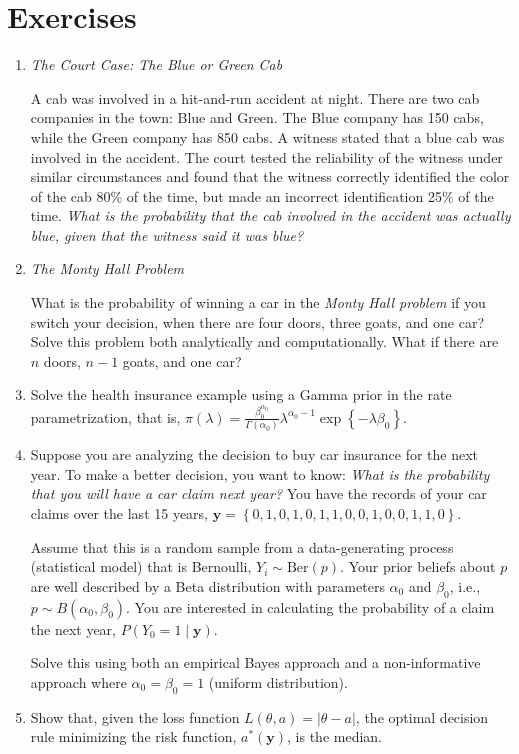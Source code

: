 \section{Exercises}

\begin{enumerate}
	\item \textit{The Court Case: The Blue or Green Cab}
	
	A cab was involved in a hit-and-run accident at night. There are two cab companies in the town: Blue and Green. The Blue company has 150 cabs, while the Green company has 850 cabs. A witness stated that a blue cab was involved in the accident. The court tested the reliability of the witness under similar circumstances and found that the witness correctly identified the color of the cab 80\% of the time, but made an incorrect identification 25\% of the time. \textit{What is the probability that the cab involved in the accident was actually blue, given that the witness said it was blue?}
	
	\item \textit{The Monty Hall Problem}
	
	What is the probability of winning a car in the \textit{Monty Hall problem} if you switch your decision, when there are four doors, three goats, and one car? Solve this problem both analytically and computationally. What if there are $n$ doors, $n-1$ goats, and one car?
	
	\item Solve the health insurance example using a Gamma prior in the rate parametrization, that is, $\pi(\lambda) = \frac{\beta_0^{\alpha_0}}{\Gamma(\alpha_0)} \lambda^{\alpha_0 - 1} \exp\left\{-\lambda \beta_0\right\}$.
	
	\item Suppose you are analyzing the decision to buy car insurance for the next year. To make a better decision, you want to know: \textit{What is the probability that you will have a car claim next year?} You have the records of your car claims over the last 15 years, $\mathbf{y} = \left\{ 0, 1, 0, 1, 0, 1, 1, 0, 0, 1, 0, 0, 1, 1, 0 \right\}$.
	
	Assume that this is a random sample from a data-generating process (statistical model) that is Bernoulli, $Y_i \sim \text{Ber}(p)$. Your prior beliefs about $p$ are well described by a Beta distribution with parameters $\alpha_0$ and $\beta_0$, i.e., $p \sim B(\alpha_0, \beta_0)$. You are interested in calculating the probability of a claim the next year, $P(Y_0 = 1 \mid \mathbf{y})$.
	
	Solve this using both an empirical Bayes approach and a non-informative approach where $\alpha_0 = \beta_0 = 1$ (uniform distribution).
	
	\item Show that, given the loss function $L(\theta, a) = |\theta - a|$, the optimal decision rule minimizing the risk function, $a^*(\mathbf{y})$, is the median.
	
\end{enumerate}



